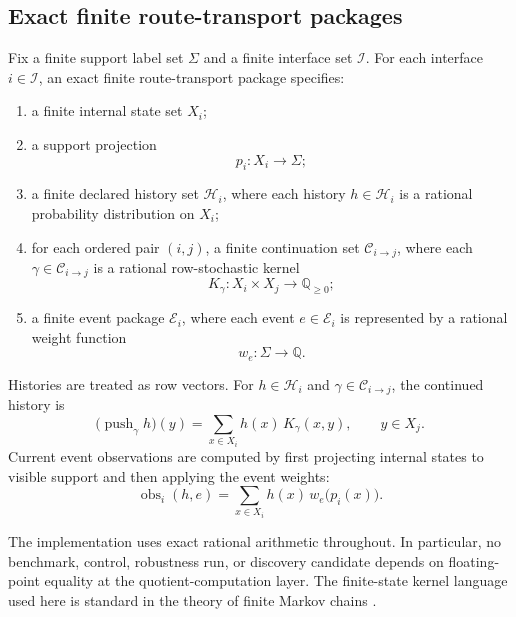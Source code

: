 \documentclass[11pt]{article}
\newcommand{\Histories}{\mathcal{H}}
\newcommand{\Interfaces}{\mathcal{I}}
\theoremstyle{definition}
\begin{document}
\subsection{Exact finite route-transport packages}\label{subsec:eff-packages}
Fix a finite support label set $\Sigma$ and a finite interface set $\Interfaces$. For each interface $i\in\Interfaces$, an exact finite route-transport package specifies:
\begin{enumerate}
\item a finite internal state set $X_i$;
\item a support projection
\[
p_i : X_i \to \Sigma;
\]
\item a finite declared history set $\Histories_i$, where each history $h\in\Histories_i$ is a rational probability distribution on $X_i$;
\item for each ordered pair $(i,j)$, a finite continuation set $\mathcal{C}_{i\to j}$, where each $\gamma\in\mathcal{C}_{i\to j}$ is a rational row-stochastic kernel
\[
K_{\gamma} : X_i \times X_j \to \mathbb{Q}_{\ge 0};
\]
\item a finite event package $\mathcal{E}_i$, where each event $e\in\mathcal{E}_i$ is represented by a rational weight function
\[
w_e : \Sigma \to \mathbb{Q}.
\]
\end{enumerate}

Histories are treated as row vectors. For $h\in\Histories_i$ and $\gamma\in\mathcal{C}_{i\to j}$, the continued history is
\begin{equation}
\bigl(\operatorname{push}_{\gamma} h\bigr)(y)
=
\sum_{x\in X_i} h(x)\,K_{\gamma}(x,y),
\qquad y\in X_j.
\label{eq:finite-push}
\end{equation}
Current event observations are computed by first projecting internal states to visible support and then applying the event weights:
\begin{equation}
\operatorname{obs}_i(h,e)
=
\sum_{x\in X_i} h(x)\,w_e\!\bigl(p_i(x)\bigr).
\label{eq:finite-observation}
\end{equation}

The implementation uses exact rational arithmetic throughout. In particular, no benchmark, control, robustness run, or discovery candidate depends on floating-point equality at the quotient-computation layer.
The finite-state kernel language used here is standard in the theory of finite Markov chains \citep{Norris1998MarkovChains}.
\end{document}
